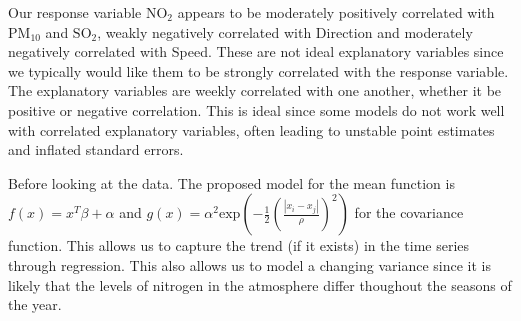 \documentclass[a4paper, 10pt]{article}
\begin{document}
\begin{flushleft}
      Our response variable $\text{NO}_{2}$ appears to be moderately positively correlated with $\text{PM}_{10}$ and $\text{SO}_{2}$, weakly negatively correlated with Direction and moderately negatively correlated with Speed. These are not ideal explanatory variables since we typically would like them to be strongly correlated with the response variable. The explanatory variables are weekly correlated with one another, whether it be positive or negative correlation. This is ideal since some models do not work well with correlated explanatory variables, often leading to unstable point estimates and inflated standard errors.

      \vspace{1em}

      Before looking at the data. The proposed model for the mean function is $f(x) = x^{T} \beta + \alpha$ and $g(x) = \alpha^{2} \text{exp}(- \frac{1}{2} (\frac{|x_i - x_j|}{\rho})^2)$ for the covariance function. This allows us to capture the trend (if it exists) in the time series through regression. This also allows us to model a changing variance since it is likely that the levels of nitrogen in the atmosphere differ thoughout the seasons of the year.
      

\end{flushleft}
\end{document}
